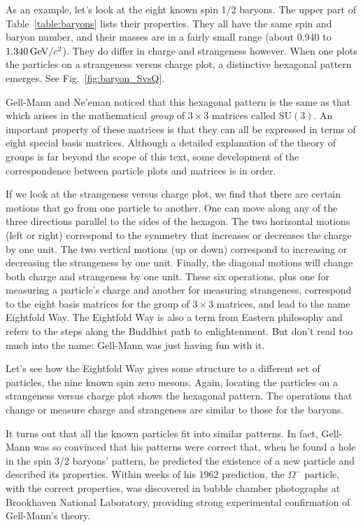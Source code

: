 As an example, let's look at the eight known spin 1/2 baryons.
The upper part of Table~\ref{table:baryons} lists their
properties.  They all have the same spin and baryon number, and
their masses are in a fairly small range (about 0.940 to
$1.340\,\mbox{GeV/$c^2$}$).  They do differ in charge and strange\-ness
however.  When one plots the particles on a strange\-ness versus
charge plot, a distinctive hexagonal pattern emerges.  See
Fig.~\ref{fig:baryon_SvsQ}.

Gell-Mann and Ne'eman noticed that this hexagonal pattern is the
same as that which arises in the mathematical {\em group} of
$3\times 3$ matrices called $\mathrm{SU}(3)$.  An important property of
these matrices is that they can all be expressed in terms of eight
special basis matrices.  Although a detailed explanation of the
theory of groups is far beyond the scope of this text, some
development of the correspondence between particle plots and
matrices is in order.

If we look at the strange\-ness versus charge plot, we find that
there are certain motions that go from one particle to another.
One can move along any of the three directions parallel to the
sides of the hexagon.  The two horizontal motions (left or right)
correspond to the symmetry that increases or decreases the charge
by one unit.  The two vertical motions (up or down) correspond to
increasing or decreasing the strange\-ness by one unit.  Finally,
the diagonal motions will change both charge and strange\-ness by
one unit.  These six operations, plus one for measuring a
particle's charge and another for measuring strange\-ness,
correspond to the eight basis matrices for the group of $3\times
3$ matrices, and lead to the name Eightfold Way. The Eightfold Way
is also a term from Eastern philosophy and refers to the steps
along the Buddhist path to enlightenment.  But don't read too much
into the name: Gell-Mann was just having fun with it.


Let's see how the Eightfold Way gives some structure to a
different set of particles, the nine known spin zero mesons.
Again, locating the particles on a strange\-ness versus charge
plot shows the hexagonal pattern.  The operations that change or
measure charge and strange\-ness are similar to those for the
baryons.

It turns out that all the known particles fit into similar
patterns. In fact, Gell-Mann was so convinced that his patterns
were correct that, when he found a hole in the spin 3/2 baryons'
pattern, he predicted the existence of a new particle and
described its properties.  Within weeks of his 1962 prediction,
the $\Omega^-$ particle, with the correct properties, was
discovered in bubble chamber photographs at Brookhaven National
Laboratory, providing strong experimental confirmation of
Gell-Mann's theory.

